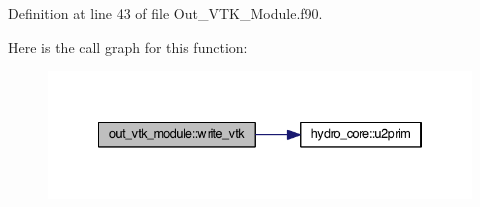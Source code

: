 Definition at line 43 of file Out\+\_\+\+V\+T\+K\+\_\+\+Module.\+f90.



Here is the call graph for this function\+:\nopagebreak
\begin{figure}[H]
\begin{center}
\leavevmode
\includegraphics[width=334pt]{namespaceout__vtk__module_ac34f91e1b74dd533461d7ead905bf937_cgraph}
\end{center}
\end{figure}


